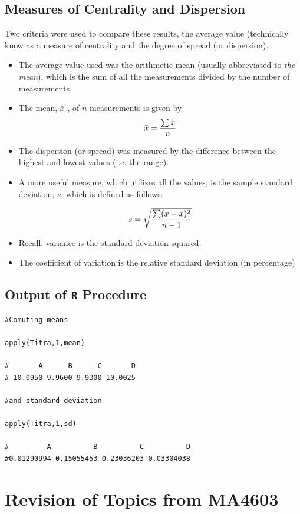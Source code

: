 \documentclass[12pt, a4paper]{article}
\begin{document}
\subsection{Measures of Centrality and Dispersion}	
Two criteria were used to compare these results, the average value (technically know
as a measure of centrality and the degree of spread (or dispersion). 	
\begin{itemize}
\item The average value
	used was the arithmetic mean (usually abbreviated to \emph{the mean}), which is the sum
	of all the measurements divided by the number of measurements.

\item	The mean, $\bar{x}$ , of $n$ measurements is given by \[ \bar{x}  = {\sum{x} \over n} \]
	
\item The dispersion (or spread) was measured by the difference between the highest and
	lowest values (i.e. the range). 
\item A more useful measure, which utilizes all the values, is the sample
	standard deviation, $s$, which is defined as follows:

	\[s=  \sqrt{ {\sum(x-\bar{x})^2 \over n-1} }   \]

\item Recall: variance is the standard deviation squared.
\item The coefficient of variation is the relative standard deviation (in
percentage)
\end{itemize}
\newpage
\subsection{Output of \texttt{R} Procedure}	
\begin{framed}
\begin{verbatim}
#Comuting means

apply(Titra,1,mean)

#       A      B      C       D
# 10.0950 9.9600 9.9300 10.0025

#and standard deviation

apply(Titra,1,sd)

#         A          B          C          D
#0.01290994 0.15055453 0.23036203 0.03304038
\end{verbatim}
\end{framed}
\newpage
\section{Revision of Topics from MA4603}
\end{document}
